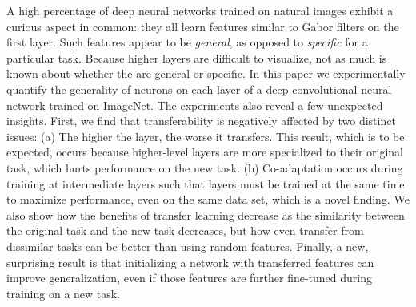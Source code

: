 
A high percentage of deep neural networks trained on
natural images exhibit a curious aspect in common: they all learn
features similar to Gabor filters on the first layer. Such features
appear to be \emph{general}, as opposed to \emph{specific} for a
particular task. Because higher layers are difficult to visualize, not
as much is known about whether the are general or specific. In this
paper we experimentally quantify the generality of neurons on each
layer of a deep convolutional neural network trained on ImageNet. The experiments also reveal a
few unexpected insights. First, we find that transferability is
negatively affected by two distinct issues: (a) The higher the layer, the worse it transfers. This result, which is to be expected, occurs because higher-level layers are more specialized to their original task, which hurts performance on the new task. (b) Co-adaptation occurs during training at intermediate layers such that layers must be trained at the same time to maximize performance, even on the same data set, which is a novel finding. 
We also
show how the benefits of transfer learning decrease as the similarity between the original task and the new task decreases, but how even transfer from dissimilar 
tasks can be better than using random features. Finally, a
new, surprising result is that initializing a network with transferred
features can improve generalization, even if those features are further fine-tuned during training on a new task. 
